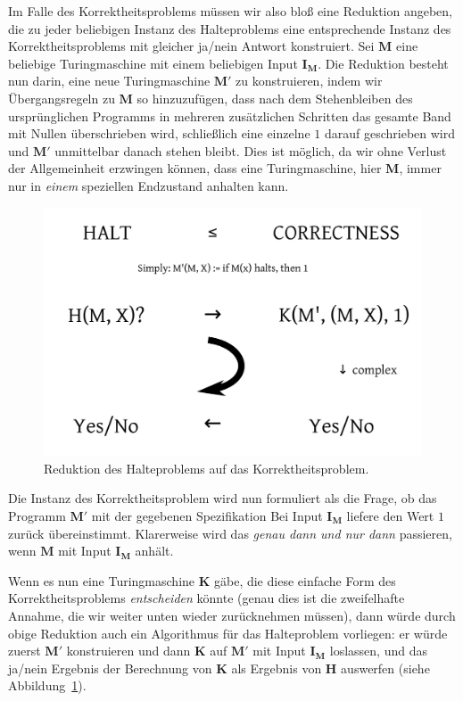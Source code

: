 Im Falle des Korrektheitsproblems m\"{u}ssen wir also blo{\ss} eine Reduktion angeben, die zu jeder beliebigen Instanz des Halteproblems eine entsprechende Instanz des Korrektheits\-problems mit gleicher ja/nein Antwort konstruiert. Sei $\mathbf{M}$ eine beliebige Turingmaschine mit einem beliebigen Input $\mathbf{I_M}$. Die Reduktion besteht nun darin, eine neue Turingmaschine $\mathbf{M'}$ zu konstruieren, indem wir \"{U}bergangsregeln zu $\mathbf{M}$ so hinzuzuf\"{u}gen, dass nach dem Stehenbleiben des urspr\"{u}nglichen Programms in mehreren zus\"{a}tzlichen Schritten das gesamte Band mit Nullen \"{u}berschrieben wird, schlie{\ss}lich eine einzelne $1$ darauf geschrieben wird und $\mathbf{M'}$ unmittelbar danach stehen bleibt. Dies ist m\"{o}glich, da wir ohne Verlust der Allgemeinheit erzwingen k\"{o}nnen, dass eine Turingmaschine, hier $\mathbf{M}$, immer nur in \emph{einem} speziellen Endzustand anhalten kann.

\begin{figure}[h]
\centering
\includegraphics[width=12cm]{img/correctnessproblem}
\caption{Reduktion des Halteproblems auf das Korrektheitsproblem.}
\label{fig:correctnessproblem}
\end{figure}

Die Instanz des Korrektheitsproblem wird nun formuliert als die Frage, ob das Programm $\mathbf{M'}$ mit der gegebenen Spezifikation \glqq{}Bei Input $\mathbf{I_M}$ liefere den Wert $1$ zur\"{u}ck\grqq{} \"{u}bereinstimmt. Klarerweise wird das \emph{genau dann und nur dann} passieren, wenn $\mathbf{M}$ mit Input $\mathbf{I_M}$ anh\"{a}lt.

Wenn es nun eine Turingmaschine $\mathbf{K}$ g\"{a}be, die diese einfache Form des Korrektheitspro\-blems \emph{entscheiden} k\"{o}nnte (genau dies ist die zweifelhafte Annahme, die wir weiter unten wieder zur\"{u}cknehmen m\"{u}ssen), dann w\"{u}rde durch obige Reduktion auch ein Algorithmus f\"{u}r das Halteproblem vorliegen: er w\"{u}rde zuerst $\mathbf{M'}$ konstruieren und dann $\mathbf{K}$ auf $\mathbf{M'}$ mit Input $\mathbf{I_M}$ loslassen, und das ja/nein Ergebnis der Berechnung von $\mathbf{K}$ als Ergebnis von $\mathbf{H}$ auswerfen (siehe Abbildung~\ref{fig:correctnessproblem}).


